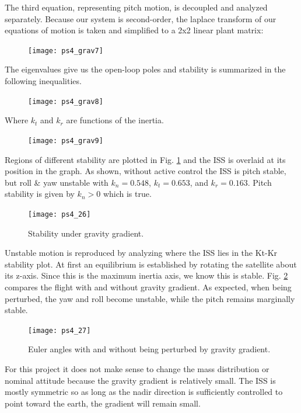 \documentclass[12pt, letterpaper]{article}
\begin{document}
The third equation, representing pitch motion, is decoupled and analyzed separately. Because our system is second-order, the laplace transform of our equations of motion is taken and simplified to a 2x2 linear plant matrix:

\begin{figure}[H]
	\centering
	\texttt{[image: ps4\_grav7]}
\end{figure}

The eigenvalues give us the open-loop poles and stability is summarized in the following inequalities.

\begin{figure}[H]
	\centering
	\texttt{[image: ps4\_grav8]}
\end{figure}

Where $k_t$ and $k_r$ are functions of the inertia.

\begin{figure}[H]
	\centering
	\texttt{[image: ps4\_grav9]}
\end{figure}

Regions of different stability are plotted in Fig. \ref{4:stableGrav} and the ISS is overlaid at its position in the graph. As shown, without active control the ISS is pitch stable, but roll \& yaw unstable with $k_n=0.548$, $k_t=0.653$, and $k_r=0.163$. Pitch stability is given by $k_n > 0$ which is true.

\begin{figure}[H]
	\centering
	\texttt{[image: ps4\_26]}
	\caption{Stability under gravity gradient.}
	\label{4:stableGrav}
\end{figure}

Unstable motion is reproduced by analyzing where the ISS lies in the Kt-Kr stability plot. At first an equilibrium is established by rotating the satellite about its z-axis. Since this is the maximum inertia axis, we know this is stable. Fig. \ref{4:eulerGrav} compares the flight with and without gravity gradient. As expected, when being perturbed, the yaw and roll become unstable, while the pitch remains marginally stable.

\begin{figure}[H]
	\centering
	\texttt{[image: ps4\_27]}
	\caption{Euler angles with and without being perturbed by gravity gradient.}
	\label{4:eulerGrav}
\end{figure}


For this project it does not make sense to change the mass distribution or nominal attitude because the gravity gradient is relatively small. The ISS is mostly symmetric so as long as the nadir direction is sufficiently controlled to point toward the earth, the gradient will remain small.
\end{document}
